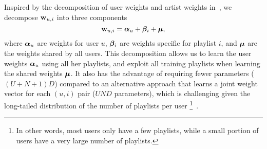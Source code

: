 Inspired by the decomposition of user weights and artist weights in~\cite{ben2017groove},
we decompose $\mathbf{w}_{u,i}$ %
into three components
\begin{equation}
\label{eq:decomp}
\mathbf{w}_{u, i} = {\bm{\alpha}}_u + {\bm{\beta}}_i + \bm{\mu},
\end{equation}
where ${\bm{\alpha}}_u$ are weights for user $u$,
${\bm{\beta}}_i$ are weights specific for playlist $i$, %
and $\bm{\mu}$ are the weights shared by all users.
This decomposition allows us to learn the user weights ${\bm{\alpha}}_u$ using all her
playlists, and exploit all training playlists when learning the shared weights $\bm{\mu}$.
It also has the advantage of requiring fewer parameters (\ie $(U + N + 1) D$) 
compared to an alternative approach that learns a joint weight vector for each $(u, i)$ pair
(\ie $U N D$ parameters),
%
which is challenging given the long-tailed distribution
of the number of playlists per user
\footnote{In other words, most users only have a few playlists, 
while a small portion of users have a very large number of playlists.}~\cite{bonnin2013evaluating}.




